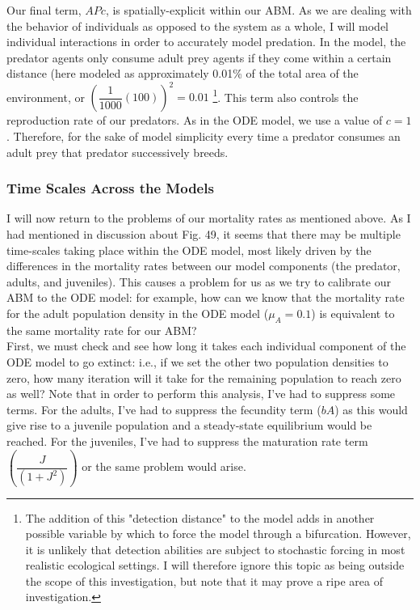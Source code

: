 \documentclass[12pt]{article}
\begin{document}
Our final term, $APc$, is spatially-explicit within our ABM. As we are dealing with the behavior of individuals as opposed to the system as a whole, I will model individual interactions in order to accurately model predation. In the model, the predator agents only consume adult prey agents if they come within a certain distance (here modeled as approximately 0.01\% of the total area of the environment, or $\left(\dfrac{1}{1000}(100)\right)^2=0.01$ \footnote{The addition of this "detection distance" to the model adds in another possible variable by which to force the model through a bifurcation. However, it is unlikely that detection abilities are subject to stochastic forcing in most realistic ecological settings. I will therefore ignore this topic as being outside the scope of this investigation, but note that it may prove a ripe area of investigation.}. This term also controls the reproduction rate of our predators. As in the ODE model, we use a value of $c=1$. Therefore, for the sake of model simplicity every time a predator consumes an adult prey that predator successively breeds. 

\subsubsection{Time Scales Across the Models}

I will now return to the problems of our mortality rates as mentioned above. As I had mentioned in discussion about Fig. 49, it seems that there may be multiple time-scales taking place within the ODE model, most likely driven by the differences in the mortality rates between our model components (the predator, adults, and juveniles). This causes a problem for us as we try to calibrate our ABM to the ODE model: for example, how can we know that the mortality rate for the adult population density in the ODE model ($\mu_A = 0.1$) is equivalent to the same mortality rate for our ABM? \\

First, we must check and see how long it takes each individual component of the ODE model to go extinct: i.e., if we set the other two population densities to zero, how many iteration will it take for the remaining population to reach zero as well? Note that in order to perform this analysis, I've had to suppress some terms. For the adults, I've had to suppress the fecundity term ($bA$) as this would give rise to a juvenile population and a steady-state equilibrium would be reached. For the juveniles, I've had to suppress the maturation rate term $\left(\dfrac{J}{(1+J^2)}\right)$ or the same problem would arise. 
\end{document}
